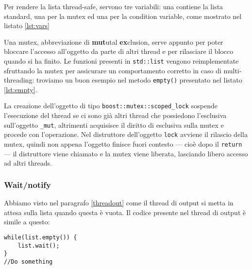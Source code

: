Per rendere la lista thread-safe, servono tre variabili: una contiene la lista
standard, una per la mutex ed una per la condition variable, come mostrato nel
listato \ref{lst:vars}

Una mutex, abbreviazione di \textbf{mut}utal \textbf{ex}clusion, serve appunto
per poter bloccare l'accesso all'oggetto da parte di altri thread e per
rilasciare il blocco quando si ha finito. Le funzioni presenti in
\texttt{std::list} vengono reimplementate sfruttando la mutex per assicurare un
comportamento corretto in caso di multi-threading: troviamo un buon esempio nel
metodo \texttt{empty()} presentato nel listato \ref{lst:empty}.


La creazione dell'oggetto di tipo \texttt{boost::mutex::scoped\_lock} sospende
l'esecuzione del thread se ci sono gi\`a altri thread che possiedono l'esclusiva
sull'oggetto \texttt{\_mut}, altrimenti acquisisce il diritto di esclusiva
sulla mutex e procede con l'operazione. Nel distruttore dell'oggetto
\texttt{lock} avviene il rilascio della mutex, quindi non appena l'oggetto
finisce fuori contesto --- cio\`e dopo il \texttt{return} --- il distruttore
viene chiamato e la mutex viene liberata, lasciando libero accesso ad altri
threads.

\subsubsection{Wait/notify}
Abbiamo visto nel paragrafo \ref{threadout} come il thread di output si metta in
attesa sulla lista quando questa \`e vuota. Il codice presente nel thread di
output \`e simile a questo:
\begin{lstlisting}
while(list.empty()) {
    list.wait();
}
//Do something
\end{lstlisting}

